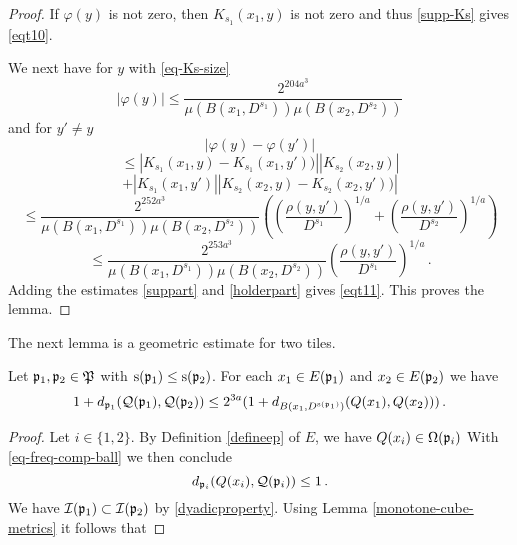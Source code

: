 {\begin{proof}
If $\varphi(y)$ is not zero, then $K_{s_1}(x_1, y)$ is not zero and thus
\eqref{supp-Ks} gives \eqref{eqt10}.

We next have for $y$ with \eqref{eq-Ks-size}
\begin{equation}\label{suppart}
    |\varphi(y)|\le
    \frac{2^{204 a^3}}{\mu(B(x_1, D^{s_1}))\mu(B(x_2, D^{s_2}))}
\end{equation}
and for $y'\neq y$
\begin{equation}
    |\varphi(y)-\varphi(y')|
 \end{equation}
 \begin{equation}
 \le
 |K_{s_1}(x_1,y)-K_{s_1}(x_1,y'))||
 K_{s_2}(x_2, y)|
\end{equation}
 \begin{equation}+|K_{s_1}(x_1, y')|
 |K_{s_2}(x_2, y) - K_{s_2}(x_2, y'))|
\end{equation}
\begin{equation}
      \le \frac{2^{252 a^3}}{\mu(B(x_1, D^{s_1}))\mu(B(x_2, D^{s_2}))}
       \left(\left(\frac{ \rho(y,y')}{D^{s_1}}\right)^{1/a}+
       \left(\frac{ \rho(y,y')}{D^{s_2}}\right)^{1/a}\right)
\end{equation}
\begin{equation}\label{holderpart}
      \le \frac{2^{253 a^3}}{\mu(B(x_1, D^{s_1}))\mu(B(x_2, D^{s_2}))}
       \left(\frac{ \rho(y,y')}{D^{s_1}}\right)^{1/a}\,.
\end{equation}
Adding the estimates \eqref{suppart} and \eqref{holderpart} gives \eqref{eqt11}.
This proves the lemma.
\end{proof}
The next lemma is a geometric estimate for two tiles.
\begin{lemma}\label{tile-uncertainty}
    Let ${\mathfrak p}_1, {\mathfrak p}_2\in {\mathfrak P}$ with
${\mathrm{s}}({{\mathfrak p}_1})\leq {\mathrm{s}}({{\mathfrak p}_2})$. For each $x_1\in E({\mathfrak p}_1)$ and
$x_2\in E({\mathfrak p}_2)$  we have
\begin{equation}\label{tgeo}
  1+d_{{\mathfrak p}_1}({\mathcal{Q}}({\mathfrak p}_1), {\mathcal{Q}}({\mathfrak p}_2))\le
    2^{3a}(1 + d_{B(x_1, D^{{\mathrm{s}}({\mathfrak p}_1)})}({Q}(x_1),{Q}(x_2)))\, .
\end{equation}
\end{lemma}
\begin{proof}
Let $i\in \{1,2\}$.
By Definition \eqref{defineep} of $E$,
we have ${Q}(x_i)\in {\Omega}({\mathfrak p}_i)$
With \eqref{eq-freq-comp-ball} we then conclude
\begin{equation}\label{dponetwo}
    d_{{\mathfrak p}_i}({Q}(x_i),{\mathcal{Q}}({\mathfrak p}_i))\le 1\, .
\end{equation}
We have ${\mathcal{I}}({\mathfrak p}_1)\subset {\mathcal{I}}({\mathfrak p}_2)$ by \eqref{dyadicproperty}. Using Lemma \ref{monotone-cube-metrics} it follows that

\end{proof}}
